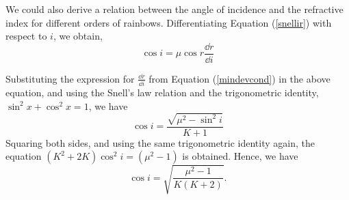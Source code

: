 We could also derive a relation between the angle of incidence and the refractive index for different orders of rainbows. Differentiating Equation (\ref{snellir}) with respect to $i$, we obtain,
 \begin{equation*}
     \cos i = \mu\cos r \frac{\dd r}{\dd i}
\end{equation*}

Substituting the expression for $\frac{\dd r}{\dd i}$ from Equation (\ref{mindevcond}) in the above equation, and using the Snell's law relation and the trigonometric identity, $\sin^2 x + \cos^2 x = 1$, we have
\begin{equation}
\cos i=\frac{\sqrt{\mu^{2}-\sin^{2}i}}{K+1}
\end{equation}
Squaring both sides, and using the same trigonometric identity again, the equation $(K^2 + 2K)\cos^2 i = (\mu^2 - 1)$ is obtained.
Hence, we have
\begin{equation}
    \cos i = \sqrt{\frac{\mu^2 - 1}{K(K+2)}}.
    \label{iK}
\end{equation}
 

